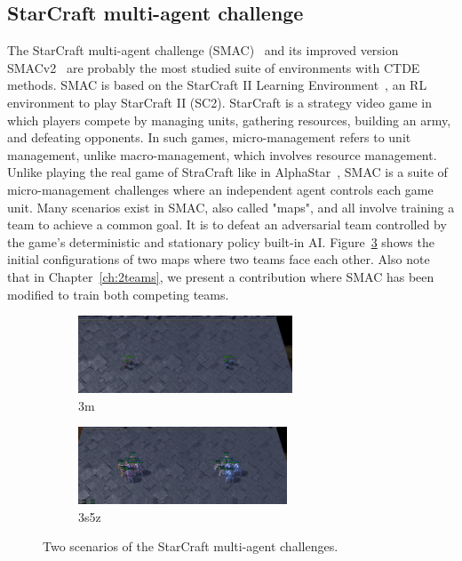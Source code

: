 \subsection{StarCraft multi-agent challenge} \label{sec:ch3_smac}
The StarCraft multi-agent challenge (SMAC)~\citep{samvelyan2019starcraft} and its improved version SMACv2~\citep{ellis2023smacv2} are probably the most studied suite of environments with CTDE methods.
SMAC is based on the StarCraft II Learning Environment~\citep{vinyals2017starcraft}, an RL environment to play StarCraft II (SC2).
StarCraft is a strategy video game in which players compete by managing units, gathering resources, building an army, and defeating opponents.
In such games, micro-management refers to unit management, unlike macro-management, which involves resource management.
Unlike playing the real game of StraCraft like in AlphaStar~\citep{vinyals2019grandmaster}, SMAC is a suite of micro-management challenges where an independent agent controls each game unit.
Many scenarios exist in SMAC, also called "maps", and all involve training a team to achieve a common goal.
It is to defeat an adversarial team controlled by the game's deterministic and stationary policy built-in AI.
Figure~\ref{fig:ch3_smac} shows the initial configurations of two maps where two teams face each other.
Also note that in Chapter~\ref{ch:2teams}, we present a contribution where SMAC has been modified to train both competing teams.

\begin{figure}
     \centering
     \begin{subfigure}[b]{0.5\textwidth}
         \centering
         \includegraphics[height=2.3cm]{tex_thesis/figures/ch3/3m_screen.pdf}
         \caption{3m}
         \label{fig:ch3_3m}
     \end{subfigure}%
     \begin{subfigure}[b]{0.5\textwidth}
         \centering
         \includegraphics[height=2.3cm]{tex_thesis/figures/ch3/3s5z_screen.pdf}
         \caption{3s5z}
         \label{fig:ch3_3s5z}
     \end{subfigure}
    \caption{Two scenarios of the StarCraft multi-agent challenges.}
    \label{fig:ch3_smac}
\end{figure}

